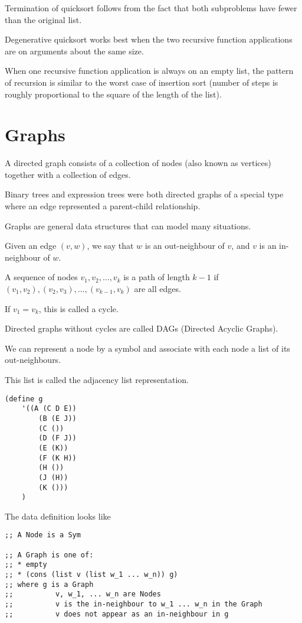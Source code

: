 \documentclass{article}
\begin{document}
Termination of quicksort follows from the fact that both subproblems have fewer than the original list. 

Degenerative quicksort works best when the two recursive function applications are on arguments about the same size. 

When one recursive function application is always on an empty list, the pattern of recursion is similar to the worst case of insertion sort (number of steps is roughly proportional to the square of the length of the list). 


\section{Graphs}

A directed graph consists of a collection of nodes (also known as vertices) together with a collection of edges. 

Binary trees and expression trees were both directed graphs of a special type where an edge represented a parent-child relationship. 

Graphs are general data structures that can model many situations. 

Given an edge $(v,w)$, we say that $w$ is an out-neighbour of $v$, and $v$ is an in-neighbour of $w$. 

A sequence of nodes $v_1, v_2, \ldots, v_k$ is a path of length $k-1$ if $(v_1, v_2), (v_2, v_3), \ldots, (v_{k-1}, v_k)$ are all edges. 

If $v_1 = v_k$, this is called a cycle. 

Directed graphs without cycles are called DAGs (Directed Acyclic Graphs). 

We can represent a node by a symbol and associate with each node a list of its out-neighbours. 

This list is called the adjacency list representation. 

\begin{lstlisting}
(define g
    '((A (C D E))
        (B (E J))
        (C ())
        (D (F J))
        (E (K))
        (F (K H))
        (H ())
        (J (H))
        (K ()))
    )
\end{lstlisting}

The data definition looks like

\begin{lstlisting}
;; A Node is a Sym

;; A Graph is one of:
;; * empty
;; * (cons (list v (list w_1 ... w_n)) g)
;; where g is a Graph
;;          v, w_1, ... w_n are Nodes
;;          v is the in-neighbour to w_1 ... w_n in the Graph
;;          v does not appear as an in-neighbour in g
\end{lstlisting}
\end{document}
